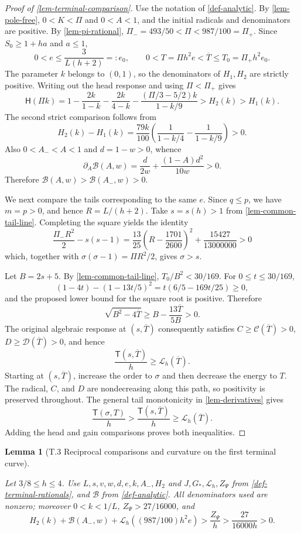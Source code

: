 \documentclass[11pt,a4paper]{article}
\theoremstyle{proofmanuscript}
\newtheorem{lemma}[theorem]{Lemma}
\begin{document}
\begin{proof}[Proof of \ref{lem-terminal-comparison}]

Use the notation of \ref{def-analytic}. By \ref{lem-pole-free}, \(0<K<\Pi\) and \(0<A<1\), and the initial radicals and denominators are positive. By \ref{lem-pi-rational}, \(\Pi_-=493/50<\Pi<987/100=\Pi_+\). Since \(S_0\ge1+ha\) and \(a\le1\), \[
0<e\le\frac3{L(h+2)}=:e_0,
\qquad 0<T=\Pi h^2e<\overline T\le T_0=\Pi_+h^2e_0.
\] The parameter \(k\) belongs to \((0,1)\), so the denominators of \(H_1,H_2\) are strictly positive. Writing out the head response and using \(\Pi<\Pi_+\) gives \[
\mathsf H(\Pi k)
=1-\frac{2k}{1-k}-\frac{2k}{4-k}
-\frac{(\Pi/3-5/2)k}{1-k/9}>H_2(k)>H_1(k).
\] The second strict comparison follows from \[
H_2(k)-H_1(k)=\frac{79k}{100}
\left(\frac1{1-k/4}-\frac1{1-k/9}\right)>0.
\] Also \(0<A_-<A<1\) and \(d=1-w>0\), whence \[
\partial_A\mathcal B(A,w)=\frac d{2w}+
\frac{(1-A)d^2}{10w}>0.
\] Therefore \(\mathcal B(A,w)>\mathcal B(A_-,w)>0\).

We next compare the tails corresponding to the same \(e\). Since \(q\le p\), we have \(m=p>0\), and hence \(R=L/(h+2)\). Take \(s=s(h)>1\) from \ref{lem-common-tail-line}. Completing the square yields the identity \[
\frac{\Pi_-R^2}{2}-s(s-1)
=\frac{13}{25}\left(R-\frac{1701}{2600}\right)^2
+\frac{15427}{13000000}>0
\] which, together with \(\sigma(\sigma-1)=\Pi R^2/2\), gives \(\sigma>s\).

Let \(B=2s+5\). By \ref{lem-common-tail-line}, \(T_0/B^2<30/169\). For \(0\le t\le30/169\), \[
(1-4t)-(1-13t/5)^2=t(6/5-169t/25)\ge0,
\] and the proposed lower bound for the square root is positive. Therefore \[
\sqrt{B^2-4\overline T}\ge B-\frac{13\overline T}{5B}>0.
\] The original algebraic response at \((s,\overline T)\) consequently satisfies \(C\ge\mathcal C(\overline T)>0\), \(D\ge\mathcal D(\overline T)>0\), and hence \[
\frac{\mathsf T(s,\overline T)}h\ge\mathcal L_h(\overline T).
\] Starting at \((s,\overline T)\), increase the order to \(\sigma\) and then decrease the energy to \(T\). The radical, \(C\), and \(D\) are nondecreasing along this path, so positivity is preserved throughout. The general tail monotonicity in \ref{lem-derivatives} gives \[
\frac{\mathsf T(\sigma,T)}h>
\frac{\mathsf T(s,\overline T)}h\ge\mathcal L_h(\overline T).
\] Adding the head and gain comparisons proves both inequalities.

\end{proof}

\begin{lemma}[T.3 Reciprocal comparisons and curvature on the first terminal curve]\label{lem-psi-payment}

Let \(3/8\le h\le4\). Use \(L,s,v,w,d,e,k,A_-,H_2\) and \(J,G_*,\mathcal L_h,Z_\Psi\) from \ref{def-terminal-rationals}, and \(\mathcal B\) from \ref{def-analytic}. All denominators used are nonzero; moreover \(0<k<1/L\), \(Z_\Psi>27/16000\), and \[
H_2(k)+\mathcal B(A_-,w)+\mathcal L_h((987/100)h^2e)
>\frac{Z_\Psi}{h}>\frac{27}{16000h}>0.
\]

\end{lemma}
\end{document}
